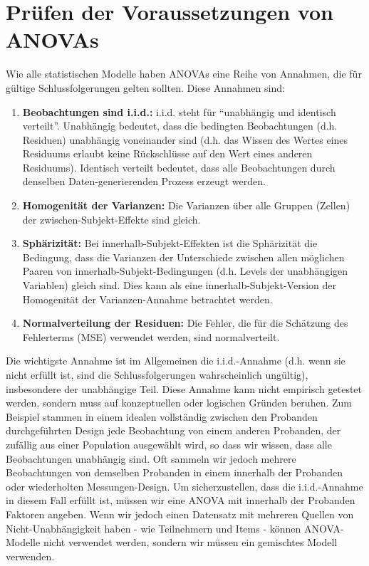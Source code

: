 \documentclass[
]{book}
\begin{document}
\section{Prüfen der Voraussetzungen von ANOVAs}\label{pruxfcfen-der-voraussetzungen-von-anovas}

Wie alle statistischen Modelle haben ANOVAs eine Reihe von Annahmen, die für gültige Schlussfolgerungen gelten sollten. Diese Annahmen sind:

\begin{enumerate}
\def\labelenumi{\arabic{enumi}.}
\item
  \textbf{Beobachtungen sind i.i.d.:} i.i.d. steht für ``unabhängig und identisch verteilt''. Unabhängig bedeutet, dass die bedingten Beobachtungen (d.h. Residuen) unabhängig voneinander sind (d.h. das Wissen des Wertes eines Residuums erlaubt keine Rückschlüsse auf den Wert eines anderen Residuums). Identisch verteilt bedeutet, dass alle Beobachtungen durch denselben Daten-generierenden Prozess erzeugt werden.
\item
  \textbf{Homogenität der Varianzen:} Die Varianzen über alle Gruppen (Zellen) der zwischen-Subjekt-Effekte sind gleich.
\item
  \textbf{Sphärizität:} Bei innerhalb-Subjekt-Effekten ist die Sphärizität die Bedingung, dass die Varianzen der Unterschiede zwischen allen möglichen Paaren von innerhalb-Subjekt-Bedingungen (d.h. Levels der unabhängigen Variablen) gleich sind. Dies kann als eine innerhalb-Subjekt-Version der Homogenität der Varianzen-Annahme betrachtet werden.
\item
  \textbf{Normalverteilung der Residuen:} Die Fehler, die für die Schätzung des Fehlerterms (MSE) verwendet werden, sind normalverteilt.
\end{enumerate}

Die wichtigste Annahme ist im Allgemeinen die i.i.d.-Annahme (d.h. wenn sie nicht erfüllt ist, sind die Schlussfolgerungen wahrscheinlich ungültig), insbesondere der unabhängige Teil. Diese Annahme kann nicht empirisch getestet werden, sondern muss auf konzeptuellen oder logischen Gründen beruhen. Zum Beispiel stammen in einem idealen vollständig zwischen den Probanden durchgeführten Design jede Beobachtung von einem anderen Probanden, der zufällig aus einer Population ausgewählt wird, so dass wir wissen, dass alle Beobachtungen unabhängig sind. Oft sammeln wir jedoch mehrere Beobachtungen von demselben Probanden in einem innerhalb der Probanden oder wiederholten Messungen-Design. Um sicherzustellen, dass die i.i.d.-Annahme in diesem Fall erfüllt ist, müssen wir eine ANOVA mit innerhalb der Probanden Faktoren angeben. Wenn wir jedoch einen Datensatz mit mehreren Quellen von Nicht-Unabhängigkeit haben - wie Teilnehmern und Items - können ANOVA-Modelle nicht verwendet werden, sondern wir müssen ein gemischtes Modell verwenden.
\end{document}
